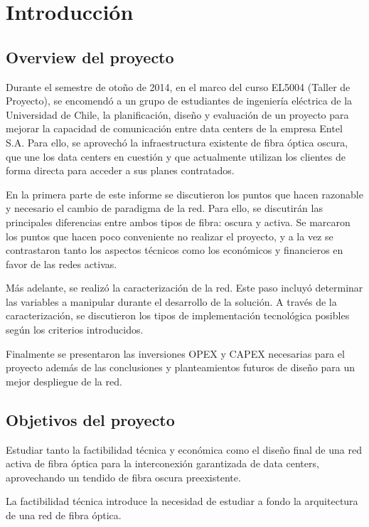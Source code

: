 \section{Introducción}
\label{sec:intro}

\subsection{Overview del proyecto}
\label{sec:overview}

Durante el semestre de otoño de 2014, en el marco del curso EL5004
(Taller de Proyecto), se encomendó a un grupo de estudiantes de
ingeniería eléctrica de la Universidad de Chile, la planificación,
diseño y evaluación de un proyecto para mejorar la capacidad de
comunicación entre data centers de la empresa Entel S.A. Para ello,
se aprovechó la infraestructura existente de fibra óptica oscura,
que une los data centers en cuestión y que actualmente utilizan los
clientes de forma directa para acceder a sus planes contratados.

En la primera parte de este informe se discutieron los puntos que
hacen razonable y necesario el cambio de paradigma de la red. Para
ello, se discutirán las principales diferencias entre ambos tipos de
fibra: oscura y activa. Se marcaron los puntos que hacen poco
conveniente no realizar el proyecto, y a la vez se contrastaron tanto
los aspectos técnicos como los económicos y financieros en favor de
las redes activas.

Más adelante, se realizó la caracterización de la red. Este paso
incluyó determinar las variables a manipular durante el desarrollo de
la solución. A través de la caracterización, se discutieron los tipos
de implementación tecnológica posibles según los criterios
introducidos.

Finalmente se presentaron las inversiones OPEX y CAPEX necesarias
para el proyecto además de las conclusiones y planteamientos futuros
de diseño para un mejor despliegue de la red.

\subsection{Objetivos del proyecto}
\label{sec:objetivos}

Estudiar tanto la factibilidad técnica y económica como el diseño
final de una red activa de fibra óptica para la interconexión
garantizada de data centers, aprovechando un tendido de fibra oscura
preexistente.

La factibilidad técnica introduce la necesidad de estudiar a fondo la
arquitectura de una red de fibra óptica.

